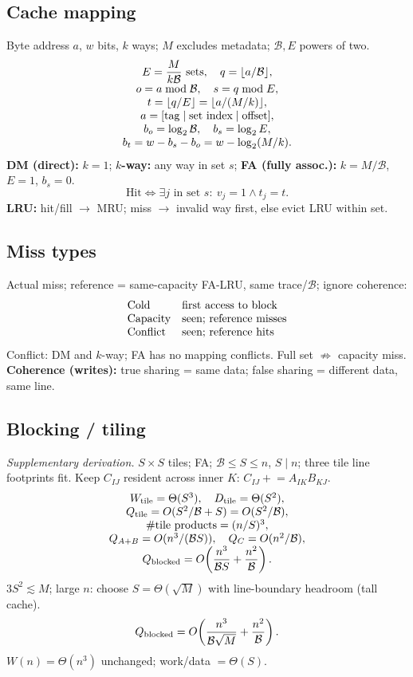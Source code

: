 \subsection{Cache mapping}
Byte address $a$, $w$ bits, $k$ ways; $M$ excludes metadata;
$\mathcal B,E$ powers of two.
\[
\begin{array}{@{}c@{}}
E=\dfrac{M}{k\mathcal B}\ \text{sets},\quad q=\lfloor a/\mathcal B\rfloor,\\
o=a\bmod\mathcal B,\quad s=q\bmod E,\\
t=\lfloor q/E\rfloor=\lfloor a/(M/k)\rfloor,\\
a=[\text{tag}\mid\text{set index}\mid\text{offset}],\\
b_o=\log_2\mathcal B,\quad b_s=\log_2E,\\
b_t=w-b_s-b_o=w-\log_2(M/k).
\end{array}
\]
\textbf{DM (direct):} $k=1$; \textbf{$k$-way:} any way in set $s$;
\textbf{FA (fully assoc.):} $k=M/\mathcal B$, $E=1$, $b_s=0$.
\[
\text{Hit}\iff\exists j\text{ in set }s:\ v_j=1\land t_j=t.
\]
\textbf{LRU:} hit/fill $\to$ MRU; miss $\to$ invalid way first,
else evict LRU within set.

\subsection{Miss types}
Actual miss; reference = same-capacity FA-LRU, same trace/$\mathcal B$;
ignore coherence:
\[
\begin{array}{@{}ll@{}}
\text{Cold}&\text{first access to block}\\
\text{Capacity}&\text{seen; reference misses}\\
\text{Conflict}&\text{seen; reference hits}
\end{array}
\]
Conflict: DM and $k$-way; FA has no mapping conflicts.
Full set $\not\Rightarrow$ capacity miss.
\textbf{Coherence (writes):} true sharing = same data;
false sharing = different data, same line.

\subsection{Blocking / tiling}
\emph{Supplementary derivation.}
$S\times S$ tiles; FA; $\mathcal B\le S\le n$, $S\mid n$;
three tile line footprints fit.
Keep $C_{IJ}$ resident across inner $K$: $C_{IJ}\mathrel{+}=A_{IK}B_{KJ}$.
\[
\begin{array}{@{}c@{}}
W_{\rm tile}=\Theta(S^3),\quad D_{\rm tile}=\Theta(S^2),\\
Q_{\rm tile}=O(S^2/\mathcal B+S)=O(S^2/\mathcal B),\\
\#\text{tile products}=(n/S)^3,\\
Q_{A+B}=O(n^3/(\mathcal BS)),\quad Q_C=O(n^2/\mathcal B),\\
Q_{\rm blocked}=O\!\left(\dfrac{n^3}{\mathcal BS}+\dfrac{n^2}{\mathcal B}\right).
\end{array}
\]
$3S^2\lesssim M$; large $n$: choose $S=\Theta(\sqrt M)$
with line-boundary headroom (tall cache).
\[
Q_{\rm blocked}=O\!\left(\dfrac{n^3}{\mathcal B\sqrt M}+\dfrac{n^2}{\mathcal B}\right).
\]
$W(n)=\Theta(n^3)$ unchanged; work/data $=\Theta(S)$.


